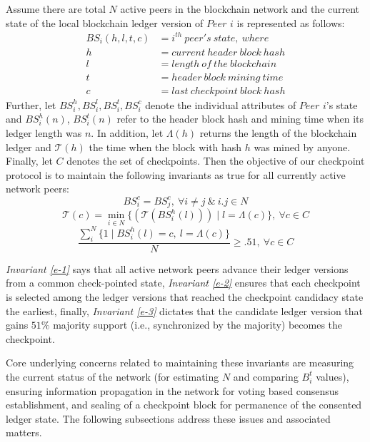 Assume there are total $N$ active peers in the blockchain network and the current state of the local blockchain ledger version of $Peer$ $i$ is represented as follows:
\begin{equation*}
\begin{split}
	BS_i(h, l, t, c) & = i^{th}\ peer's\ state,\ where \\
	h & = current\ header\ block\ hash \\
	l & = length\ of\ the\ blockchain \\
	t & = header\ block\ mining\ time \\
	c & = last\ checkpoint\ block\ hash	 
\end{split}
\end{equation*}
Further, let $BS_i^h, BS_i^l, BS_i^t, BS_i^c$ denote the individual attributes of $Peer$ $i$'s state and $BS_i^h(n)$, $BS_i^t(n)$ refer to the header block hash and mining time when its ledger length was $n$. In addition, let $\Lambda(h)$ returns the length of the blockchain ledger and $\mathcal{T}(h)$ the time when the block with hash $h$ was mined by anyone. Finally, let $C$ denotes the set of checkpoints. Then the objective of our checkpoint protocol is to maintain the following invariants as true for all currently active network peers:
\begin{equation}
\label{e-1}
BS_i^c = BS_j^c,\ \forall i \neq j\ \&\ i.j \in N
\end{equation}
\begin{equation}
\label{e-2}
\mathcal{T}(c) = \min_{i \in N}\{(\mathcal{T}(BS_i^h(l))) \mid l = \Lambda(c)\},\ \forall c \in C  
\end{equation}
\begin{equation}
\label{e-3}
\frac{\sum_i^N{\{1 \mid BS_i^h(l) = c,\ l = \Lambda(c)}\}}{N} \geq .51,\ \forall c \in C  
\end{equation}

\textit{Invariant \ref{e-1}} says that all active network peers advance their ledger versions from a common check-pointed state, \textit{Invariant \ref{e-2}} ensures that each checkpoint is selected among the ledger versions that reached the checkpoint candidacy state the earliest, finally, \textit{Invariant \ref{e-3}} dictates that the candidate ledger version that gains $51\%$ majority support (i.e., synchronized by the majority) becomes the checkpoint. 

Core underlying concerns related to maintaining these invariants are measuring the current status of the network (for estimating $N$ and comparing $B_i^t$ values), ensuring information propagation in the network for voting based consensus establishment, and sealing of a checkpoint block for permanence of the consented ledger state. The following subsections address these issues and associated matters.    

